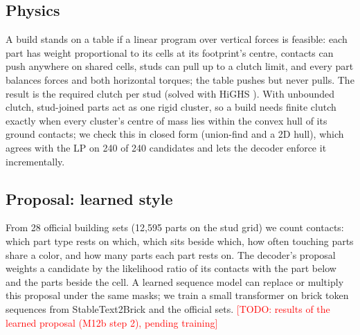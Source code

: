 \documentclass[10pt,twocolumn]{article}
\newcommand{\todo}[1]{\textcolor{red}{[TODO: #1]}}
\begin{document}
\subsection{Physics}\label{sec:physics}
A build stands on a table if a linear program over vertical forces is feasible: each part has weight proportional to
its cells at its footprint's centre, contacts can push anywhere on shared cells, studs can pull up to a clutch limit,
and every part balances forces and both horizontal torques; the table pushes but never pulls. The result is the
required clutch per stud (solved with HiGHS \cite{huangfu2018highs}). With unbounded clutch, stud-joined parts act as one rigid cluster, so a build needs finite
clutch exactly when every cluster's centre of mass lies within the convex hull of its ground contacts; we check this
in closed form (union-find and a 2D hull), which agrees with the LP on 240 of 240 candidates and lets the decoder
enforce it incrementally.

\subsection{Proposal: learned style}\label{sec:style}
From 28 official building sets (12,595 parts on the stud grid) we count contacts: which part type rests on which,
which sits beside which, how often touching parts share a color, and how many parts each part rests on.
The decoder's proposal weights a candidate by the likelihood ratio of its contacts with the part below and the parts
beside the cell. A learned sequence model can replace or multiply this proposal under the same masks; we train a
small transformer \cite{vaswani2017attention} on brick token sequences from StableText2Brick and the official sets.
\todo{results of the learned proposal (M12b step 2), pending training}
\end{document}
